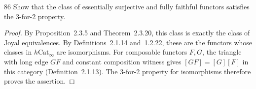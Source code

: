 \begin{exercise}{86}
Show that the class of essentially surjective and fully faithful functors satisfies
the 3-for-2 property.

\begin{proof}
By Proposition~2.3.5 and Theorem~2.3.20, this class is
exactly the class of Joyal equivalences.
By Definitions~2.1.14 and~1.2.22, these are the functors
whose classes in $h\mathrm{Cat}_\infty$ are isomorphisms.
For composable functors $F,G$, the triangle with long edge
$GF$ and constant composition witness gives
$[GF]=[G][F]$ in this category
(Definition~2.1.13).
The 3-for-2 property for isomorphisms therefore proves
the assertion.
\end{proof}
\end{exercise}
